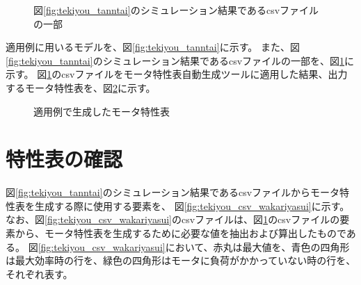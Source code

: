 \begin{figure}[p]
	\centering
	\caption{図\ref{fig:tekiyou_tanntai}のシミュレーション結果であるcsvファイルの一部}
	\label{fig:tekiyou_csv}
\end{figure}

適用例に用いるモデルを、図\ref{fig:tekiyou_tanntai}に示す。
また、図\ref{fig:tekiyou_tanntai}のシミュレーション結果であるcsvファイルの一部を、図\ref{fig:tekiyou_csv}に示す。
図\ref{fig:tekiyou_csv}のcsvファイルをモータ特性表自動生成ツールに適用した結果、出力するモータ特性表を、図\ref{fig:tekiyou_mortoku}に示す。


\begin{figure}[p]
	\centering
	\caption{適用例で生成したモータ特性表}
	\label{fig:tekiyou_mortoku}
\end{figure}



\section{特性表の確認}
図\ref{fig:tekiyou_tanntai}のシミュレーション結果であるcsvファイルからモータ特性表を生成する際に使用する要素を、
図\ref{fig:tekiyou_csv_wakariyasui}に示す。
なお、図\ref{fig:tekiyou_csv_wakariyasui}のcsvファイルは、図\ref{fig:tekiyou_csv}のcsvファイルの要素から、モータ特性表を生成するために必要な値を抽出および算出したものである。
図\ref{fig:tekiyou_csv_wakariyasui}において、赤丸は最大値を、青色の四角形は最大効率時の行を、緑色の四角形はモータに負荷がかかっていない時の行を、それぞれ表す。

